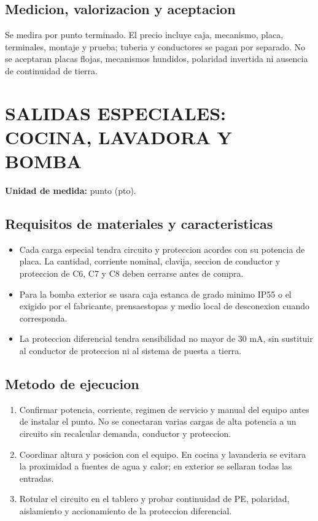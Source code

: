 \subsection{Medicion, valorizacion y aceptacion}
Se medira por punto terminado. El precio incluye caja, mecanismo, placa, terminales,
montaje y prueba; tuberia y conductores se pagan por separado. No se aceptaran placas
flojas, mecanismos hundidos, polaridad invertida ni ausencia de continuidad de tierra.

\section{SALIDAS ESPECIALES: COCINA, LAVADORA Y BOMBA}

\textbf{Unidad de medida:} punto (pto).

\subsection{Requisitos de materiales y caracteristicas}
\begin{itemize}
  \item Cada carga especial tendra circuito y proteccion acordes con su potencia de
  placa. La cantidad, corriente nominal, clavija, seccion de conductor y proteccion de
  C6, C7 y C8 deben cerrarse antes de compra.
  \item Para la bomba exterior se usara caja estanca de grado minimo IP55 o el exigido
  por el fabricante, prensaestopas y medio local de desconexion cuando corresponda.
  \item La proteccion diferencial tendra sensibilidad no mayor de 30 mA, sin sustituir
  al conductor de proteccion ni al sistema de puesta a tierra.
\end{itemize}

\subsection{Metodo de ejecucion}
\begin{enumerate}
  \item Confirmar potencia, corriente, regimen de servicio y manual del equipo antes de
  instalar el punto. No se conectaran varias cargas de alta potencia a un circuito sin
  recalcular demanda, conductor y proteccion.
  \item Coordinar altura y posicion con el equipo. En cocina y lavanderia se evitara la
  proximidad a fuentes de agua y calor; en exterior se sellaran todas las entradas.
  \item Rotular el circuito en el tablero y probar continuidad de PE, polaridad,
  aislamiento y accionamiento de la proteccion diferencial.
\end{enumerate}

